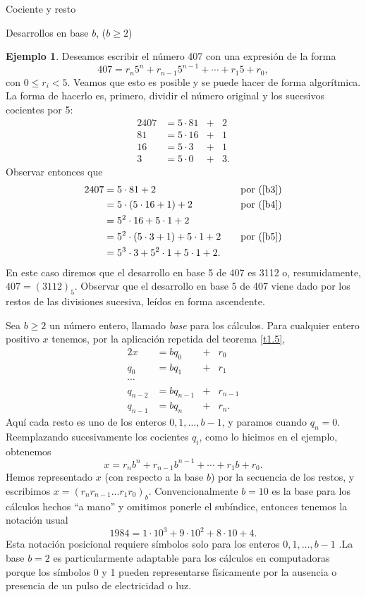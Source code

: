 \documentclass[11pt,spanish,makeidx]{amsbook}
\theoremstyle{definition}
\newtheorem{ejemplo}{Ejemplo}[section]
\theoremstyle{remark}
\begin{document}
\begin{section}{Cociente y resto}
\begin{subsection}{Desarrollos en base $b$, ($b \ge 2$)}
\begin{ejemplo} Deseamos escribir el número 407 con una expresión de la forma 
$$
407 = r_n5^n +r_{n-1} 5^{n-1}+\cdots + r_1 5 + r_0,
$$
con $0 \le r_i < 5$. Veamos que esto es posible y se puede hacer de forma algorítmica. La forma de hacerlo  es, primero, dividir el número original y los sucesivos cocientes por 5:  
\begin{alignat}2
407 &=5\cdot 81 &+& 2 \label{b3}\\
81 & = 5\cdot 16 &+& 1  \label{b4}\\
16 & = 5\cdot 3 &+& 1  \label{b5}\\
3 & = 5\cdot 0 &+& 3.
\end{alignat}
Observar entonces que
\begin{alignat*}2
407 &=5\cdot 81 + 2  &\quad& \text{por (\ref{b3})}\\
 &= 5\cdot (5\cdot 16 + 1) + 2  &\quad& \text{por (\ref{b4})}\\
 &= 5^2 \cdot 16+ 5\cdot 1 + 2 &\quad& \text{}\\
 &= 5^2 \cdot (5\cdot 3 + 1)+ 5\cdot 1 + 2   &\quad& \text{por (\ref{b5})}\\
 &= 5^3 \cdot 3+ 5^2 \cdot 1 + 5\cdot 1 + 2.  &\quad& \text{}
\end{alignat*}
En este caso diremos que el desarrollo en base 5 de 407 es 3112 o, resumidamente, $407 = (3112)_5$.  Observar que el desarrollo en base 5 de 407 viene dado por los restos de las divisiones sucesiva, leídos en forma ascendente.
\end{ejemplo}

Sea $b \ge 2$ un número entero, llamado {\em base} para los cálculos. Para cualquier entero positivo $x$ tenemos, por la aplicación repetida del teorema \ref{t1.5},
\begin{alignat*}2
x&=bq_0 &+& r_0 \\
q_0 & = bq_1 &+&r_1 \\
\cdots & \\
q_{n-2} & = bq_{n-1} &+&r_{n-1} \\
q_{n-1} & = bq_n &+&r_n.
\end{alignat*}
Aquí cada resto es uno de los enteros $0, 1,\ldots,b-1$, y paramos cuando $q_n=0$. Reemplazando sucesivamente los cocientes $q_i$, como lo hicimos en el ejemplo, obtenemos
$$
x=r_nb^n +r_{n-1} b^{n-1}+\cdots + r_1 b + r_0.
$$
Hemos representado $x$ (con respecto a la base $b$) por la secuencia de los restos, y escribimos $x=(r_nr_{n-1}\dots r_1 r_0)_b$. Convencionalmente $b=10$ es la base para los cálculos hechos ``a mano'' y omitimos ponerle el subíndice, entonces tenemos la notación usual
$$
1984=1\cdot 10^3  + 9\cdot 10^2 +8\cdot 10  + 4.
$$
Esta notación posicional requiere símbolos solo para los enteros $0, 1,\ldots,b-1$ .La base $b=2$ es particularmente adaptable para los cálculos en computadoras porque los símbolos 0 y 1 pueden representarse físicamente por la ausencia o presencia de un pulso de electricidad o luz. 


\end{subsection}
\end{section}
\end{document}
